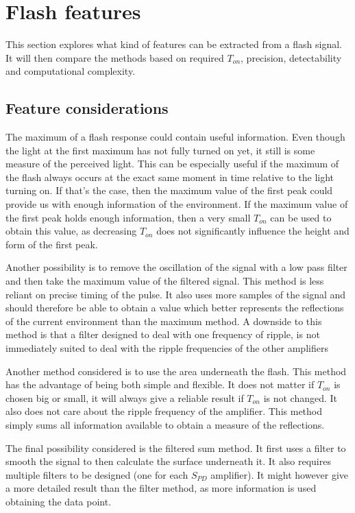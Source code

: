 \section{Flash features}
This section explores what kind of features can be extracted from a flash signal. It will then compare the methods based on required $T_{on}$, precision, detectability and computational complexity.

\subsection{Feature considerations}
The maximum of a flash response could contain useful information. Even though the light at the first maximum has not fully turned on yet, it still is some measure of the perceived light. This can be especially useful if the maximum of the flash always occurs at the exact same moment in time relative to the light turning on. If that's the case, then the maximum value of the first peak could provide us with enough information of the environment. If the maximum value of the first peak holds enough information, then a very small $T_{on}$ can be used to obtain this value, as decreasing $T_{on}$ does not significantly influence the height and form of the first peak.

Another possibility is to remove the oscillation of the signal with a low pass filter and then take the maximum value of the filtered signal. This method is less reliant on precise timing of the pulse. It also uses more samples of the signal and should therefore be able to obtain a value which better represents the reflections of the current environment than the maximum method. A downside to this method is that a filter designed to deal with one frequency of ripple, is not immediately suited to deal with the ripple frequencies of the other amplifiers

Another method considered is to use the area underneath the flash. This method has the advantage of being both simple and flexible. It does not matter if $T_{on}$ is chosen big or small, it will always give a reliable result if $T_{on}$ is not changed. It also does not care about the ripple frequency of the amplifier. This method simply sums all information available to obtain a measure of the reflections.

The final possibility considered is the filtered sum method. It first uses a filter to smooth the signal to then calculate the surface underneath it. It also requires multiple filters to be designed (one for each $S_{PD}$ amplifier). It might however give a more detailed result than the filter method, as more information is used obtaining the data point.

